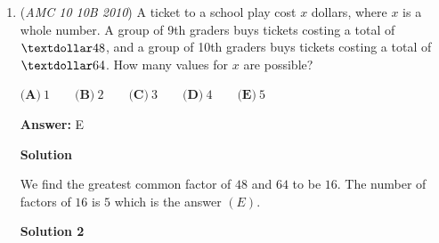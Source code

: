 \begin{enumerate}
 The length of the rectangle therefore is:$l = \dfrac{48}{4} = 12$

 The perimeter of the rectangle then becomes:$2l + 2w = 2*12 + 2*4 = 32$

 The answer is:

 $\boxed{\textbf{(D)}\ 32}$




\textbf{Solution 2}

An alternative way to find the area of the triangle is by using Heron's formula, $A=\sqrt{(s)(s-a)(s-b)(s-c)}$ where $s$ is the semi-perimeter of the triangle (meaning half the perimeter). Here, the semi-perimeter is $(10+10+12)/2 = 16$. Thus the area equals $\sqrt{(16)(16-10)(16-10)(16-12)} = \sqrt{16*6*6*4} = 48.$ We know that the width of the rectangle is $4$, so $48/4 = 12$, which is the length. The perimeter of the rectangle is $2(4+12) =$ $\boxed{\textbf{(D)}\ 32}$.

 (Solution by Flamedragon)

 



\textbf{Solution 3}

Note that a triangle with side lengths $10,10,12$ is essentially $2$   “6,8,10” right triangles stuck together. Hence, the height is $8$, and our area is $48$.

 So, the length of the rectangle is $\frac{48}{4}=12$, and our perimeter $P=2(4+12)=\boxed{\textbf{(D)}\ 32}$

 \textbf{Video Solution=} 


	\item (\textit{AMC 10 10B 2010}) A ticket to a school play cost $x$ dollars, where $x$ is a whole number. A group of 9th graders buys tickets costing a total of $\textdollar 48$, and a group of 10th graders buys tickets costing a total of $\textdollar 64$. How many values for $x$ are possible?


 $\textbf{(A)}\ 1 \qquad \textbf{(B)}\ 2 \qquad \textbf{(C)}\ 3 \qquad \textbf{(D)}\ 4 \qquad \textbf{(E)}\ 5$

 \textbf{Answer: }E



\textbf{Solution}

We find the greatest common factor of $48$ and $64$ to be $16$. The number of factors of $16$ is $5$ which is the answer $(E)$.

 



\textbf{Solution 2}


\end{enumerate}
